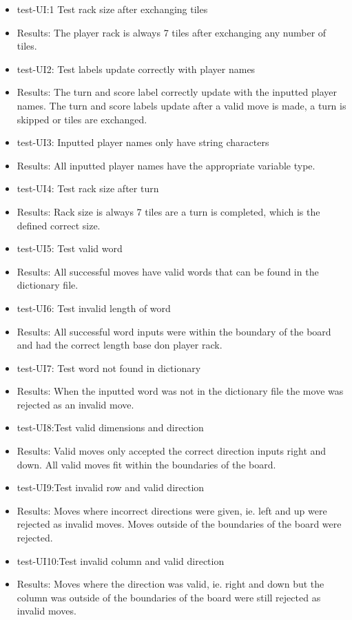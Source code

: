 \documentclass[12pt, titlepage]{article}
\begin{document}
\begin{itemize}
    \item test-UI:1 Test rack size after exchanging tiles
    \item Results: The player rack is always 7 tiles after exchanging any number of tiles.
    \item test-UI2: Test labels update correctly with player names
    \item Results: The turn and score label correctly update with the inputted player names. The turn and score labels update after a valid move is made, a turn is skipped or tiles are exchanged.
    \item test-UI3: Inputted player names only have string characters
    \item Results: All inputted player names have the appropriate variable type.
    \item test-UI4: Test rack size after turn
    \item Results: Rack size is always 7 tiles are a turn is completed, which is the defined correct size.
    \item test-UI5: Test valid word
    \item Results: All successful moves have valid words that can be found in the dictionary file.
    \item test-UI6: Test invalid length of word
    \item Results: All successful word inputs were within the boundary of the board and had the correct length base don player rack.
    \item test-UI7: Test word not found in dictionary
    \item Results: When the inputted word was not in the dictionary file the move was rejected as an invalid move.
    \item test-UI8:Test valid dimensions and direction
    \item Results: Valid moves only accepted the correct direction inputs right and down. All valid moves fit within the boundaries of the board.
    \item test-UI9:Test invalid row and valid direction
    \item Results: Moves where incorrect directions were given, ie. left and up were rejected as invalid moves. Moves outside of the boundaries of the board were rejected.
    \item test-UI10:Test invalid column and valid direction
    \item Results: Moves where the direction was valid, ie. right and down but the column was outside of the boundaries of the board were still rejected as invalid moves.

\end{itemize}
\end{document}
